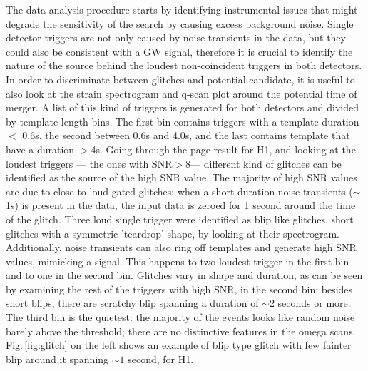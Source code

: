 \documentclass[binding=0.6cm, LaM]{sapthesis}
\begin{document}
	The  data analysis procedure starts by identifying instrumental issues 
	that might degrade the sensitivity of the search by causing excess background noise.
	Single detector triggers are not only caused by noise transients in the data,
	but they could also be consistent with a GW signal, 
	therefore it is crucial to identify the nature of  the source behind the loudest non-coincident triggers in both detectors.
	In order to discriminate between glitches and potential candidate, 
	it is useful to also look at the strain spectrogram and q-scan plot around the potential time of merger.
	A list of this kind of triggers is generated for both detectors and divided by template-length bins.
	The first bin contains triggers with a template duration $<$ 0.6s, 
	the second between 0.6s and 4.0s, and the last contains template that have a  duration $>$4s.
	Going through the page result for H1, and looking at the loudest triggers — the ones with SNR$>$8—
	different kind of glitches can be identified as the source of the high SNR value.
	The majority of high SNR values are due to close to loud gated glitches: 
	when a short-duration noise transients ($\sim$1s) is present in the data,
	the input data is zeroed for 1 second around the time of the glitch.
	Three loud single trigger were identified as blip like glitches, 
	short glitches with a symmetric 'teardrop' shape, by looking at their spectrogram.
	Additionally, noise transients can also ring off templates and generate high SNR values,
	mimicking a signal.
	This happens to two loudest trigger in the first bin and to one in the second bin.
	Glitches vary in shape and duration, as can be seen by examining the rest of the triggers with high SNR,  in the second bin:
	besides short blips, there are scratchy blip spanning a duration of $\sim$2 seconds or more.
	The third bin is the quietest: the majority of the events looks like random noise barely above the threshold; 
	there are no distinctive features in the omega scans. 
	Fig.\,\ref{fig:glitch} on the left shows an example of blip type glitch with few fainter blip around it spanning $\sim1$ second, for H1.
\end{document}
